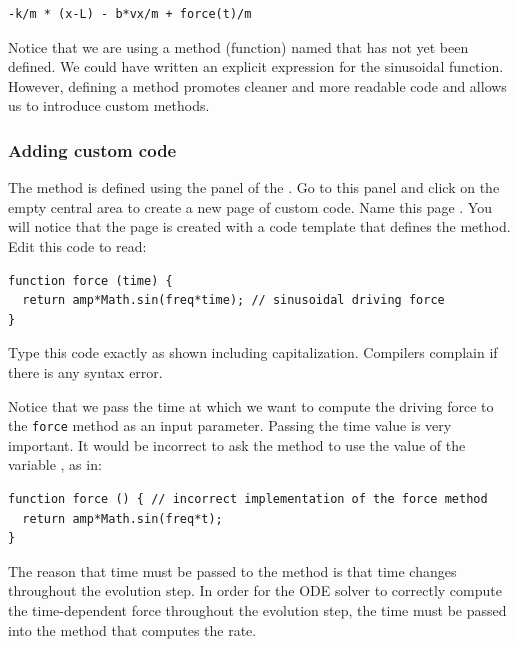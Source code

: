 \begin{listing}
\begin{verbatim}
-k/m * (x-L) - b*vx/m + force(t)/m
\end{verbatim}
\end{listing}
Notice that we are using a method (function) named  that has not yet been defined.
We could have written an explicit expression for the sinusoidal function. However, defining a  method promotes cleaner and more readable code and allows us to introduce custom methods.

\subsubsection{Adding custom code}

The  method is defined using the  panel of the . Go to this panel and click on the
empty central area to create a new page of custom code. Name this page . You will notice that the
page is created with a code template that defines the method. Edit this code to read:

\begin{listing}
\begin{verbatim}
function force (time) {
  return amp*Math.sin(freq*time); // sinusoidal driving force
}
\end{verbatim}
\end{listing}
Type this code exactly as shown including capitalization. Compilers complain if there is any syntax error.

Notice that we pass the time at which we want to compute the driving force to the \texttt{force} method as an input parameter. Passing
the time value is very important. It would be incorrect to ask the method to use the value of the variable , as
in:

\begin{listing}
\begin{verbatim}
function force () { // incorrect implementation of the force method
  return amp*Math.sin(freq*t); 
}
\end{verbatim}
\end{listing}

\noindent The reason that time must be passed to the method is that time changes throughout the evolution step.  In order for the ODE solver to correctly compute the time-dependent force throughout the evolution step, the time must be passed into the method that computes the rate.

